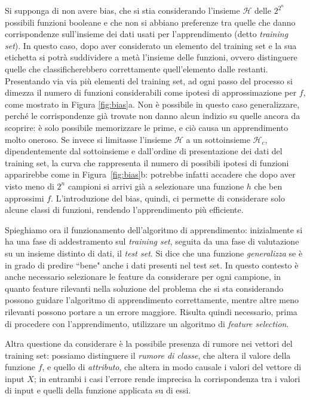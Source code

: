 \documentclass[oneside, openany]{book}
\begin{document}
		Si supponga di non avere bias, che si stia considerando l'insieme $\mathcal{H}$ delle $2^{2^n}$ possibili funzioni booleane e che non si abbiano preferenze tra quelle che danno corrispondenze sull'insieme dei dati usati per l'apprendimento (detto \textit{training set}). In questo caso, dopo aver considerato un elemento del training set e la sua etichetta si potrà suddividere a metà l'insieme delle funzioni, ovvero distinguere quelle che classificherebbero correttamente quell'elemento dalle restanti. Presentando via via più elementi del training set, ad ogni passo del processo si dimezza il numero di funzioni considerabili come ipotesi di approssimazione per $f$, come mostrato in Figura \ref{fig:bias}a. Non è possibile in questo caso generalizzare, perché le corrispondenze già trovate non danno alcun indizio su quelle ancora da scoprire: è solo possibile memorizzare le prime, e ciò causa un apprendimento molto oneroso.\newline
		Se invece si limitasse l'insieme $\mathcal{H}$ a un sottoinsieme $\mathcal{H}_c$, dipendentemente dal sottoinsieme e dall'ordine di presentazione dei dati del training set, la curva che rappresenta il numero di possibili ipotesi di funzioni apparirebbe come in Figura~\ref{fig:bias}b: potrebbe infatti accadere che dopo aver visto meno di $2^n$ campioni si arrivi già a selezionare una funzione $h$ che ben approssimi $f$. L'introduzione del bias, quindi, ci permette di considerare solo alcune classi di funzioni, rendendo l'apprendimento più efficiente.
		
		Spieghiamo ora il funzionamento dell'algoritmo di apprendimento: inizialmente si ha una fase di addestramento sul \textit{training set}, seguita da una fase di valutazione su un insieme distinto di dati, il \textit{test set}. Si dice che una funzione \textit{generalizza} se è in grado di predire ``bene" anche i dati presenti nel test set.\newline
		In questo contesto è anche necessario selezionare le feature da considerare per ogni campione, in quanto feature rilevanti nella soluzione del problema che si sta considerando possono guidare l'algoritmo di apprendimento correttamente, mentre altre meno rilevanti possono portare a un errore maggiore. Risulta quindi necessario, prima di procedere con l'apprendimento, utilizzare un algoritmo di \textit{feature selection}.
		
		Altra questione da considerare è la possibile presenza di rumore nei vettori del training set: possiamo distinguere il \textit{rumore di classe}, che altera il valore della funzione $f$, e quello di \textit{attributo}, che altera in modo causale i valori del vettore di input $X$; in entrambi i casi l'errore rende imprecisa la corrispondenza tra i valori di input e quelli della funzione applicata su di essi.\\
		
\end{document}
